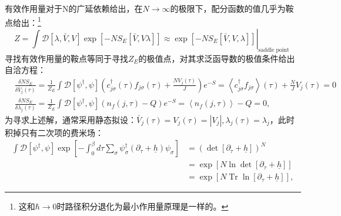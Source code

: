 \documentclass[10pt,openany]{book}
\theoremstyle{thmstyle} %
\theoremstyle{defstyle} %
\theoremstyle{prostyle} %
\begin{document}
有效作用量对于N的广延依赖给出，在$ N\to\infty $的极限下，配分函数的值几乎为鞍点给出：\footnote{这和$ \hbar\to 0 $时路径积分退化为最小作用量原理是一样的。}
\begin{equation}
	Z=\left.\int \mathcal{D}[\lambda, \bar{V}, V] \exp \left[-N S_E[\bar{V}, V \lambda]\right] \approx \exp \left[-N S_E[\bar{V}, V, \lambda]\right]\right|_{\text {saddle point }}
\end{equation} 
寻找有效作用量的鞍点等同于寻找$ Z_E $的极值点，对其求泛函导数的极值条件给出自洽方程：
\begin{equation}
	\begin{aligned}
		& \frac{\delta N S_E}{\delta \bar{V}_j(\tau)}=\frac{1}{Z_E} \int \mathcal{D}\left[\psi^{\dagger}, \psi\right]\left(c_{j \sigma}^{\dagger}(\tau) f_{j \sigma}(\tau)+\frac{N V_j(\tau)}{J}\right) e^{-S}=\left\langle c_{j \sigma}^{\dagger} f_{j \sigma}\right\rangle(\tau)+\frac{N}{J} V_j(\tau)=0 \\
		& \frac{\delta N S_E}{\delta \lambda_j(\tau)}=\frac{1}{Z_E} \int \mathcal{D}\left[\psi^{\dagger}, \psi\right]\left(n_f(j, \tau)-Q\right) e^{-S}=\left\langle n_f(j, \tau)\right\rangle-Q=0,
		\end{aligned}
\end{equation} 
为寻求上述解，通常采用静态拟设：$ \bar{V}_j(\tau)=V_j(\tau)=\left|V_j\right|, \lambda_j(\tau)=\lambda_j $，此时积掉只有二次项的费米场：
\begin{equation}
	\begin{aligned}
		\int \mathcal{D}\left[\psi^{\dagger}, \psi\right] \exp \left[-\int_0^\beta d \tau \sum_\sigma \psi_\sigma^{\dagger}\left(\partial_\tau+\underline{h}\right) \psi_\sigma\right] & =\left(\operatorname{det}\left[\partial_\tau+\underline{h}\right]\right)^N \\
		& =\exp \left[N \ln \operatorname{det}\left[\partial_\tau+\underline{h}\right]\right] \\
		& =\exp \left[N \operatorname{Tr} \ln \left[\partial_\tau+\underline{h}\right]\right],
		\end{aligned}
\end{equation}
\end{document}
